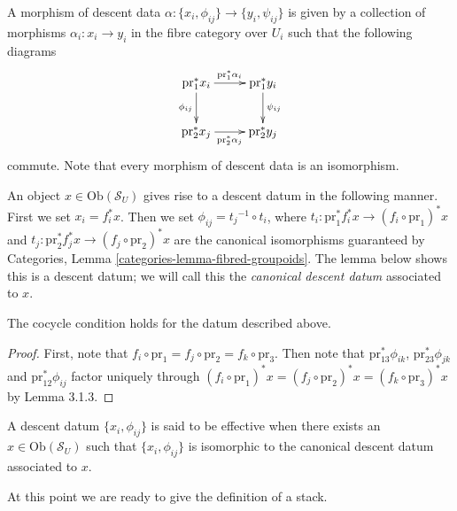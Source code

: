 \smallskip\noindent
A morphism of descent data 
$\alpha : \{x_i, \phi_{ij}\} \rightarrow \{y_i, \psi_{ij}\}$ is given by a 
collection of morphisms $\alpha_i : x_i \to y_i$ in the fibre category
over $U_i$ such that the following diagrams
$$
\xymatrix{
\text{pr}_1^\ast x_i
	\ar[r]^{\text{pr}_1^\ast \alpha_i}
	\ar[d]_{\phi_{ij}}
&
\text{pr}_1^\ast y_i
	\ar[d]^{\psi_{ij}}
\\
\text{pr}_2^\ast x_j
	\ar[r]_{\text{pr}_2^\ast \alpha_j}
&
\text{pr}_2^\ast y_j
}
$$
commute. Note that every morphism of descent data is an isomorphism.

\smallskip\noindent
An object $x \in \text{Ob}(\mathcal{S}_U)$ gives rise to a descent
datum in the following manner. First we set $x_i = f_i^\ast x$.
Then we set $\phi_{ij} = {t_{j}}^{-1} \circ t_{i}$, where 
$t_{i}: \text{pr}_1^\ast f_i^\ast x \to (f_i \circ \text{pr}_1)^\ast x$
and $t_{j}: \text{pr}_2^\ast f_j^\ast x \to (f_j \circ \text{pr}_2)^\ast x$ 
are the canonical isomorphisms guaranteed by Categories, 
Lemma \ref{categories-lemma-fibred-groupoids}.
The lemma below shows this is a descent datum; we will call
this the {\it canonical descent datum} associated to $x$.

\begin{lemma}
\label{lemma-trivial-cocycle}
The cocycle condition holds for the datum described above.
\end{lemma}

\begin{proof}
First, note that $f_i \circ\text{pr}_1 = f_j \circ \text{pr}_2=
f_k\circ \text{pr}_3$. Then note that $\text{pr}_{13}^\ast \phi_{ik}$,
$\text{pr}_{23}^\ast \phi_{jk}$ and $\text{pr}_{12}^\ast \phi_{ij}$ factor
uniquely through $(f_i\circ\text{pr}_1)^\ast x = 
(f_j \circ\text{pr}_2)^\ast x = (f_k \circ\text{pr}_3)^\ast x$
by Lemma 3.1.3.
\end{proof}

\begin{definition}
\label{definition-effective-descent-datum}
A descent datum $\{x_i,\phi_{ij}\}$ is said to be effective
when there exists an $x\in \text{Ob}(\mathcal{S}_U)$ 
such that $\{x_i,\phi_{ij}\}$ is isomorphic to the
canonical descent datum associated to $x$.
\end{definition}

\noindent
At this point we are ready to give the definition of a
stack. 

